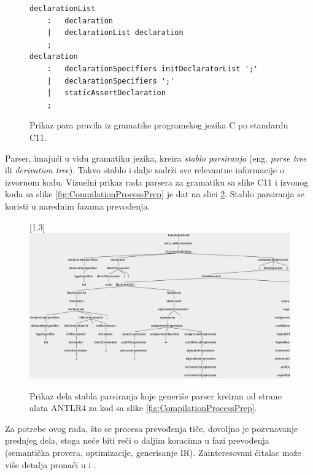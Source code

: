 \begin{figure}[h!]
\begin{lstlisting}[language={}]
declarationList
    :   declaration
    |   declarationList declaration
    ;
declaration
    :   declarationSpecifiers initDeclaratorList ';'
    | 	declarationSpecifiers ';'
    |   staticAssertDeclaration
    ;
\end{lstlisting}
\caption{Prikaz para pravila iz gramatike programskog jezika C po standardu C11.}
\label{fig:CompilationProcessGram}
\end{figure}

Parser, imajući u vidu gramatiku jezika, kreira \emph{stablo parsiranja} (eng. \emph{parse tree} ili \emph{derivation tree}). Takvo stablo i dalje sadrži sve relevantne informacije o izvornom kodu. Vizuelni prikaz rada parsera za gramatiku sa slike C11 i izvonog koda sa slike \ref{fig:CompilationProcessPrep} je dat na slici \ref{fig:CompilationProcessPars}. Stablo parsiranja se koristi u narednim fazama prevođenja.

\begin{figure}[h!]
\centering
\scalebox{0.95}[1.3] {
    \includegraphics[width=\textwidth]{images/parse_tree.png}
}
\caption{Prikaz dela stabla parsiranja koje generiše parser kreiran od strane alata ANTLR4 \cite{ANTLR} za kod sa slike \ref{fig:CompilationProcessPrep}.}
\label{fig:CompilationProcessPars}
\end{figure}

Za potrebe ovog rada, što se procesa prevođenja tiče, dovoljno je pozvnavanje prednjeg dela, stoga neće biti reči o daljim koracima u fazi prevođenja (semantička provera, optimizacije, generisanje IR). Zainteresovani čitalac može više detalja pronaći u \cite{EngineeringCompilers} i \cite{CompilerConstruction}. 

